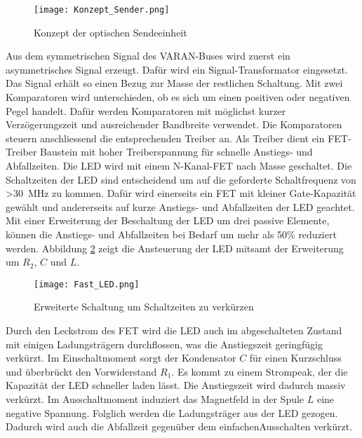 \begin{figure}[H]
	\centering
	\texttt{[image: Konzept\_Sender.png]}
	\caption{Konzept der optischen Sendeeinheit}\label{fig:Konzept_Sender}
\end{figure}

Aus dem symmetrischen Signal des VARAN-Buses wird zuerst ein asymmetrisches Signal erzeugt. Dafür wird ein Signal-Transformator eingesetzt. Das Signal erhält so einen Bezug zur Masse der restlichen Schaltung. Mit zwei Komparatoren wird unterschieden, ob es sich um einen positiven oder negativen Pegel handelt. Dafür werden Komparatoren mit möglichst kurzer Verzögerungszeit und ausreichender Bandbreite verwendet. Die Komparatoren steuern anschliessend die entsprechenden Treiber an. 
\newline
Als Treiber dient ein FET-Treiber Baustein mit hoher Treiberspannung für schnelle Anstiegs- und Abfallzeiten. Die LED wird mit einem N-Kanal-FET nach Masse geschaltet. Die Schaltzeiten der LED sind entscheidend um auf die geforderte Schaltfrequenz von \textgreater \SI{30}{MHz} zu kommen. Dafür wird einerseits ein FET mit kleiner Gate-Kapazität gewählt und andererseits auf kurze Anstiegs- und Abfallzeiten der LED geachtet.
\newline
Mit einer Erweiterung der Beschaltung der LED um drei passive Elemente, können die Anstiegs- und Abfallzeiten bei Bedarf um mehr als 50\% reduziert werden. Abbildung \ref{fig:Fast_LED} zeigt die Ansteuerung der LED mitsamt der Erweiterung um $R_{2}$, $C$ und $L$.

 \begin{figure}[h]
 	\centering
 	\texttt{[image: Fast\_LED.png]}
 	\caption{Erweiterte Schaltung um Schaltzeiten zu verkürzen}\label{fig:Fast_LED}
 \end{figure}

Durch den Leckstrom des FET wird die LED auch im abgeschalteten Zustand mit einigen Ladungsträgern durchflossen, was die Anstiegszeit geringfügig verkürzt. Im Einschaltmoment sorgt der Kondensator $C$ für einen Kurzschluss und überbrückt den Vorwiderstand $R_{1}$. Es kommt zu einem Strompeak, der die Kapazität der LED schneller laden lässt. Die Anstiegszeit wird dadurch massiv verkürzt. Im Ausschaltmoment induziert das Magnetfeld in der Spule $L$ eine negative Spannung. Folglich werden die Ladungsträger aus der LED gezogen. Dadurch wird auch die Abfallzeit gegenüber dem \glqq einfachen\grqq Ausschalten verkürzt. \cite{high-speed-led}

\newpage
